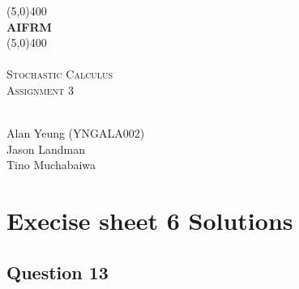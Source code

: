 \documentclass[a4paper, 12pt]{article}
\begin{document}
	
	\begin{titlepage}
		\begin{center}
				\line(5,0){400}\\
				[0.5cm]
			\huge{\bfseries AIFRM}\\
			\line(5,0){400}\\
			
			\textsc{\Large \\ Stochastic Calculus \\ Assignment 3}
			
		\end{center}
	
	
\vfill 
{}\\
\newline
Alan Yeung (YNGALA002)\\
Jason Landman\\
Tino Muchabaiwa\\

	\end{titlepage}	

\newpage
\section*{Execise sheet 6 Solutions}

\subsection*{Question 13}
\end{document}
